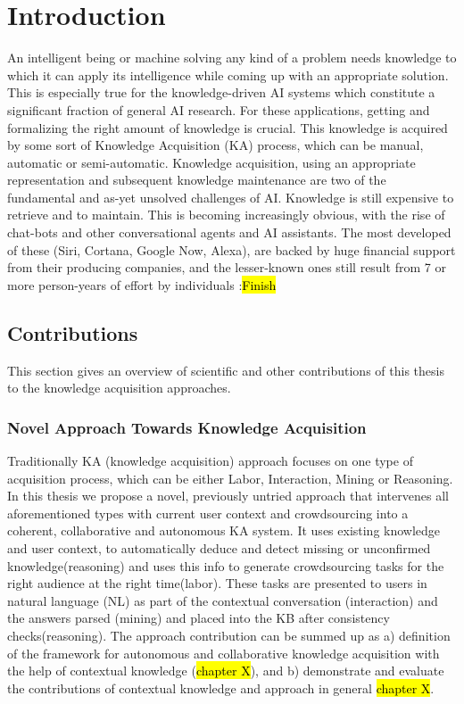 % 
\chapter{Introduction}
An intelligent being or machine solving any kind of a problem needs knowledge to which it can apply its intelligence while coming up with an appropriate solution. This is especially true for the knowledge-driven AI systems which constitute a significant fraction of general AI research. For these applications, getting and formalizing the right amount of knowledge is crucial. This knowledge is acquired by some sort of Knowledge Acquisition (KA) process, which can be manual, automatic or semi-automatic. Knowledge acquisition, using an appropriate representation and subsequent knowledge maintenance are two of the fundamental and as-yet unsolved challenges of AI. Knowledge is still expensive to retrieve and to maintain. This is becoming increasingly obvious, with the rise of chat-bots and other conversational agents and AI assistants. The most developed of these (Siri, Cortana, Google Now, Alexa), are backed by huge financial support from their producing companies, and the lesser-known ones still result from 7 or more person-years of effort by individuals
\todo:{\hl{Finish}}

\section{Contributions}
This section gives an overview of scientific and other contributions of this thesis to the knowledge acquisition approaches.

\subsection{Novel Approach Towards Knowledge Acquisition}
Traditionally KA (knowledge acquisition) approach focuses on one type of acquisition process, which can be either Labor, Interaction, Mining or Reasoning\parencite{Zang2013}. In this thesis we propose a novel, previously untried approach that intervenes all aforementioned types with current user context and crowdsourcing into a coherent, collaborative and autonomous KA system. It uses existing knowledge and user context, to automatically deduce and detect  missing or unconfirmed knowledge(reasoning) and uses this info to generate crowdsourcing tasks for the right audience at the right time(labor). These tasks are presented to users in natural language (NL) as part of the contextual conversation (interaction) and the answers parsed (mining) and placed into the KB after consistency checks(reasoning). The approach contribution can be summed up as a) definition of the framework for autonomous and collaborative knowledge acquisition with the help of contextual knowledge (\hl{chapter X}), and b) demonstrate and evaluate the contributions of contextual knowledge and approach in general \hl{chapter X}.

